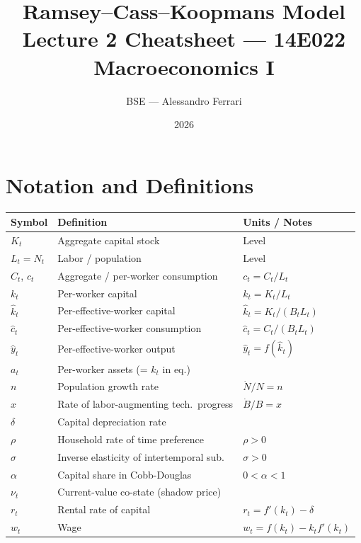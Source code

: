 \documentclass[a4paper,11pt]{article}
\title{\textbf{Ramsey--Cass--Koopmans Model}\\
       \large Lecture 2 Cheatsheet --- 14E022 Macroeconomics I}
\author{BSE --- Alessandro Ferrari}
\date{2026}
\newcommand{\khat}{\hat{k}}
\newcommand{\chat}{\hat{c}}
\newcommand{\yhat}{\hat{y}}
\begin{document}
\maketitle
\tableofcontents
\newpage

\section{Notation and Definitions}

\begin{center}
\begin{tabular}{lll}
\toprule
\textbf{Symbol} & \textbf{Definition} & \textbf{Units / Notes} \\
\midrule
$K_t$ & Aggregate capital stock & Level \\
$L_t = N_t$ & Labor / population & Level \\
$C_t$, $c_t$ & Aggregate / per-worker consumption & $c_t = C_t/L_t$ \\
$k_t$ & Per-worker capital & $k_t = K_t/L_t$ \\
$\khat_t$ & Per-effective-worker capital & $\khat_t = K_t/(B_t L_t)$ \\
$\chat_t$ & Per-effective-worker consumption & $\chat_t = C_t/(B_t L_t)$ \\
$\yhat_t$ & Per-effective-worker output & $\yhat_t = f(\khat_t)$ \\
$a_t$ & Per-worker assets (= $k_t$ in eq.) & \\
$n$ & Population growth rate & $\dot{N}/N = n$ \\
$x$ & Rate of labor-augmenting tech.\ progress & $\dot{B}/B = x$ \\
$\delta$ & Capital depreciation rate & \\
$\rho$ & Household rate of time preference & $\rho > 0$ \\
$\sigma$ & Inverse elasticity of intertemporal sub. & $\sigma > 0$ \\
$\alpha$ & Capital share in Cobb-Douglas & $0 < \alpha < 1$ \\
$\nu_t$ & Current-value co-state (shadow price) & \\
$r_t$ & Rental rate of capital & $r_t = f'(k_t) - \delta$ \\
$w_t$ & Wage & $w_t = f(k_t) - k_t f'(k_t)$ \\
\bottomrule
\end{tabular}
\end{center}
\end{document}
